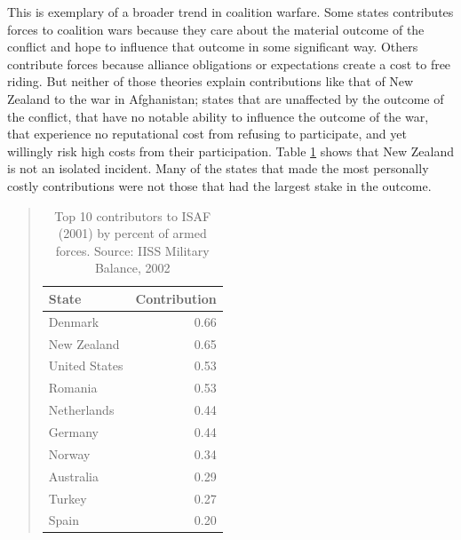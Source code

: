\documentclass[12pt,letterpaper]{article}
\begin{document}
	This is exemplary of a broader trend in coalition warfare. Some states contributes forces to coalition wars because they care about the material outcome of the conflict and hope to influence that outcome in some significant way. Others contribute forces because alliance obligations or expectations create a cost to free riding. But neither of those theories explain contributions like that of New Zealand to the war in Afghanistan; states that are unaffected by the outcome of the conflict, that have no notable ability to influence the outcome of the war, that experience no reputational cost from refusing to participate, and yet willingly risk high costs from their participation. Table \ref{table:2001_top} shows that New Zealand is not an isolated incident. Many of the states that made the most personally costly contributions were not those that had the largest stake in the outcome.

	\vspace{-4em}

		\begin{quote}
		\begin{table}[ht]
			\centering
			\begin{tabular}{|lr|}
				\hline
				\textbf{State} & \textbf{Contribution} \\
				\hline
				Denmark & 0.66 \\
				New Zealand & 0.65 \\
				United States & 0.53 \\
				Romania & 0.53 \\
				Netherlands & 0.44 \\
				Germany & 0.44 \\
				Norway & 0.34 \\
				Australia & 0.29 \\
				Turkey & 0.27 \\
				Spain & 0.20 \\
				\hline
			\end{tabular}
		\caption{Top 10 contributors to ISAF (2001) by percent of armed forces. Source: IISS Military Balance, 2002 }
		\label{table:2001_top}
		\end{table}
		\end{quote}
\end{document}
